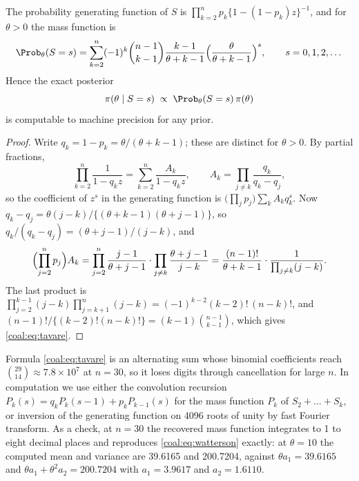 \begin{corollary}\label{coal:cor:exact}
The probability generating function of $S$ is $\prod_{k=2}^n p_k\{1-(1-p_k)z\}^{-1}$, and for $\theta>0$ the mass function is
\begin{equation}\label{coal:eq:tavare}
\Prob_\theta(S=s)=\sum_{k=2}^n(-1)^k\binom{n-1}{k-1}\frac{k-1}{\theta+k-1}\Bigl(\frac{\theta}{\theta+k-1}\Bigr)^s,\qquad s=0,1,2,\dots
\end{equation}
Hence the exact posterior
\begin{equation}\label{coal:eq:post}
\pi(\theta\mid S=s)\;\propto\;\Prob_\theta(S=s)\,\pi(\theta)
\end{equation}
is computable to machine precision for any prior.
\end{corollary}

\begin{proof}
Write $q_k=1-p_k=\theta/(\theta+k-1)$; these are distinct for $\theta>0$. By partial fractions,
\[
\prod_{k=2}^n\frac{1}{1-q_kz}=\sum_{k=2}^n\frac{A_k}{1-q_kz},\qquad A_k=\prod_{j\ne k}\frac{q_k}{q_k-q_j},
\]
so the coefficient of $z^s$ in the generating function is $\bigl(\prod_jp_j\bigr)\sum_kA_kq_k^s$. Now $q_k-q_j=\theta(j-k)/\{(\theta+k-1)(\theta+j-1)\}$, so $q_k/(q_k-q_j)=(\theta+j-1)/(j-k)$, and
\[
\Bigl(\prod_{j=2}^n p_j\Bigr)A_k=\prod_{j=2}^n\frac{j-1}{\theta+j-1}\cdot\prod_{j\ne k}\frac{\theta+j-1}{j-k}
=\frac{(n-1)!}{\theta+k-1}\cdot\frac{1}{\prod_{j\ne k}(j-k)}.
\]
The last product is $\prod_{j=2}^{k-1}(j-k)\prod_{j=k+1}^n(j-k)=(-1)^{k-2}(k-2)!\,(n-k)!$, and $(n-1)!/\{(k-2)!(n-k)!\}=(k-1)\binom{n-1}{k-1}$, which gives \eqref{coal:eq:tavare}.
\end{proof}

Formula \eqref{coal:eq:tavare} is an alternating sum whose binomial coefficients reach $\binom{29}{14}\approx7.8\times10^7$ at $n=30$, so it loses digits through cancellation for large $n$. In computation we use either the convolution recursion $P_k(s)=q_kP_k(s-1)+p_kP_{k-1}(s)$ for the mass function $P_k$ of $S_2+\dots+S_k$, or inversion of the generating function on 4096 roots of unity by fast Fourier transform. As a check, at $n=30$ the recovered mass function integrates to 1 to eight decimal places and reproduces \eqref{coal:eq:watterson} exactly: at $\theta=10$ the computed mean and variance are 39.6165 and 200.7204, against $\theta a_1=39.6165$ and $\theta a_1+\theta^2a_2=200.7204$ with $a_1=3.9617$ and $a_2=1.6110$.

